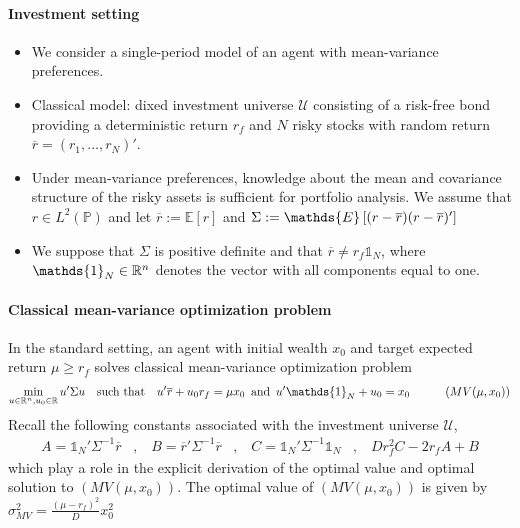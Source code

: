 \paragraph{Investment setting}
\begin{itemize}
    \item We consider a single-period model of an agent with mean-variance
        preferences.
    \item Classical model: dixed investment universe $\mathcal{U}$ consisting
        of a risk-free bond providing a deterministic return $r_f$ and $N$
        risky stocks with random return $\overline{r} = (r_1,\dots,r_N)'$.
    \item Under mean-variance preferences, knowledge about the mean and
        covariance structure of the risky assets is sufficient for portfolio
        analysis. We assume that $r \in L^2(\mathds{P})$ and let $\overline{r}
        := \mathds{E}[r]$ and $\Sigma := \mathds{E} \eckigeklammer{(r-\overline{r})
        (r-\overline{r})'}$
    \item We suppose that $\Sigma$ is positive definite and that $\overline{r}
        \neq r_f \mathds{1}_N$, where $\mathds{1}_N \in \R^n$ denotes the
        vector with all components equal to one. 
\end{itemize}
\paragraph{Classical mean-variance optimization problem}
In the standard setting, an agent with initial wealth $x_0$ and target expected
return $\mu \geq r_f$ solves classical mean-variance optimization problem
\begin{align*}
    \min_{u \in \R^n,u_0 \in \R} u' \Sigma u
    \hspace{10pt} \text{such that} \hspace{10pt}
    u' \overline{r} + u_0 r_f = \mu x_0
    \hspace{5pt} \text{and} \hspace{5pt}
    u' \mathds{1}_N + u_0 = x_0
    \hspace{30pt}
    (MV(\mu,x_0))
\end{align*}
Recall the following constants associated with the investment universe
$\mathcal{U}$,
\begin{align*}
    A = \mathds{1}_N' \Sigma^{-1} \overline{r}
    \hspace{10pt} , \hspace{10pt}
    B = \overline{r}' \Sigma^{-1} \overline{r}
    \hspace{10pt} , \hspace{10pt}
    C = \mathds{1}_N' \Sigma^{-1} \mathds{1}_N
    \hspace{10pt} , \hspace{10pt}
    D r_f^2 C - 2 r_f A + B
\end{align*}
which play a role in the explicit derivation of the optimal value and optimal
solution to $(MV(\mu,x_0))$. The optimal value of $(MV(\mu,x_0))$ is given by
$\sigma^2_{MV} = \frac{(\mu - r_f)^2}{D} x_0^2$

